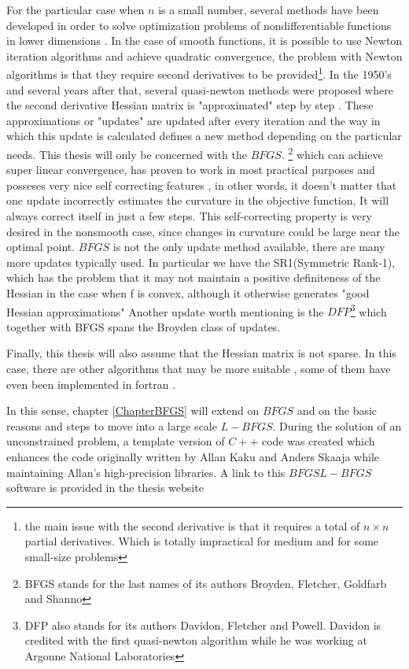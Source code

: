 For the particular case when $n$ is a small number, several methods have been developed in order to solve optimization problems of nondifferentiable functions in lower dimensions \citep{kiwiel85}.  In the case of smooth functions, it is possible to use Newton iteration algorithms and achieve quadratic convergence, the problem with Newton algorithms is that they require second derivatives to be provided\footnote{the main issue with the second derivative is that it requires a total of $n \times n$ partial derivatives.  Which is totally impractical for medium and for some small-size problems}.  In the 1950's and several years after that, several quasi-newton methods were proposed where the second derivative Hessian matrix is "approximated" step by step \citep{unconstrained}.  These approximations or "updates" are updated after every iteration and the way in which this update is calculated defines a new method depending on the particular needs.  This thesis will only be concerned with the $BFGS$.  \footnote{BFGS stands for the last names of its authors Broyden, Fletcher, Goldfarb and Shanno} which can achieve super linear convergence, has proven to work in most practical purposes and posseses very nice self correcting features \citep{selfcorrecting}, in other words, it doesn't matter that one update incorrectly estimates the curvature in the objective function,  It will always correct itself in just a few steps.  This self-correcting property is very desired in the nonsmooth case, since changes in curvature could be large near the optimal point.   $BFGS$ is not the only update method available, there are many more updates typically used.  In particular we have the SR1(Symmetric Rank-1), which has the problem that it may not maintain a positive definiteness of the Hessian in the case when f is convex, although it otherwise generates "good Hessian approximations"\citep{nocedal} Another update worth mentioning is the $DFP$\footnote{DFP also stands for its authors Davidon, Fletcher and Powell.  Davidon is credited with the first quasi-newton algorithm while he was working at Argonne National Laboratories} which together with BFGS spans the Broyden class of updates.

Finally, this thesis will also assume that the Hessian matrix is not sparse.  In this case, there are other algorithms that may be more suitable \citep{Fletcher96computingsparse, sparse}, some of them have even been implemented in fortran \citep{lancelot}.

In this sense, chapter \ref{ChapterBFGS} will extend on $BFGS$ and on the basic reasons and steps to move into a large scale $L-BFGS$.  During the solution of an unconstrained problem, a template version of $C++$ code was created which enhances the code originally written by Allan Kaku and Anders Skaaja \citep{kaku} while maintaining Allan's high-precision libraries.  A link to this $BFGS L-BFGS$ software is provided in the thesis website

